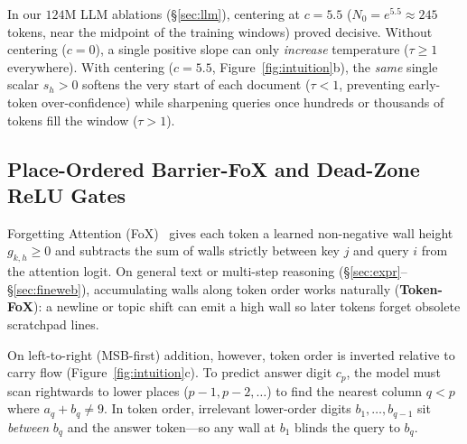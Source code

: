 \documentclass[10pt]{article}
\begin{document}
In our $124\text{M}$ LLM ablations (\S\ref{sec:llm}), centering at $c = 5.5$ ($N_0 = e^{5.5} \approx 245$ tokens, near the midpoint of the training windows) proved decisive. Without centering ($c = 0$), a single positive slope can only \emph{increase} temperature ($\tau \ge 1$ everywhere). With centering ($c = 5.5$, Figure~\ref{fig:intuition}b), the \emph{same} single scalar $s_h > 0$ softens the very start of each document ($\tau < 1$, preventing early-token over-confidence) while sharpening queries once hundreds or thousands of tokens fill the window ($\tau > 1$).

\subsection{Place-Ordered Barrier-FoX and Dead-Zone ReLU Gates}
\label{sec:bfox}

Forgetting Attention (FoX)~\cite{lin2025} gives each token a learned non-negative wall height $g_{k,h} \ge 0$ and subtracts the sum of walls strictly between key $j$ and query $i$ from the attention logit. On general text or multi-step reasoning (\S\ref{sec:expr}--\S\ref{sec:fineweb}), accumulating walls along token order works naturally (\textbf{Token-FoX}): a newline or topic shift can emit a high wall so later tokens forget obsolete scratchpad lines.

On left-to-right (MSB-first) addition, however, token order is inverted relative to carry flow (Figure~\ref{fig:intuition}c). To predict answer digit $c_p$, the model must scan rightwards to lower places ($p-1, p-2, \dots$) to find the nearest column $q < p$ where $a_q + b_q \neq 9$. In token order, irrelevant lower-order digits $b_1, \dots, b_{q-1}$ sit \emph{between} $b_q$ and the answer token---so any wall at $b_1$ blinds the query to $b_q$.
\end{document}
